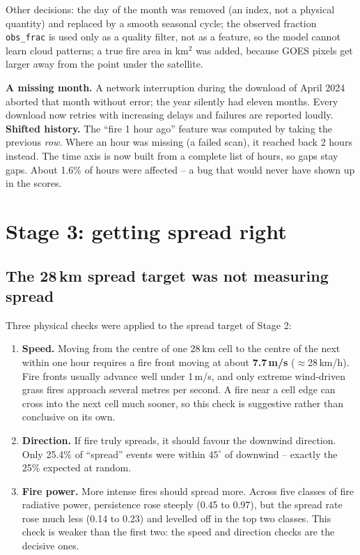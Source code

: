 \documentclass[11pt,a4paper,oneside]{report}
\newcommand{\code}[1]{\texttt{\small #1}}
\begin{document}
Other decisions: the day of the month was removed (an index, not a physical
quantity) and replaced by a smooth seasonal cycle; the observed fraction
\code{obs\_frac} is used only as a quality filter, not as a feature, so the model
cannot learn cloud patterns; a true fire area in km$^2$ was added, because GOES
pixels get larger away from the point under the satellite.

\begin{warnbox}
\textbf{A missing month.} A network interruption during the download of April
2024 aborted that month without error; the year silently had eleven months.
Every download now retries with increasing delays and failures are reported
loudly.\\[0.3em]
\textbf{Shifted history.} The \enquote{fire 1 hour ago} feature was computed by
taking the previous \emph{row}. Where an hour was missing (a failed scan), it
reached back 2 hours instead. The time axis is now built from a complete list of
hours, so gaps stay gaps. About 1.6\% of hours were affected -- a bug that would
never have shown up in the scores.
\end{warnbox}

\chapter{Stage 3: getting spread right}\label{ch:spread}

\section{The 28\,km spread target was not measuring spread}

Three physical checks were applied to the spread target of Stage 2:

\begin{enumerate}
  \item \textbf{Speed.} Moving from the centre of one 28\,km cell to the centre
        of the next within one hour requires a fire front moving at about
        \textbf{7.7\,m/s} ($\approx$28\,km/h). Fire fronts usually advance well
        under 1\,m/s, and only extreme wind-driven grass fires approach several
        metres per second. A fire near a cell edge can cross into the next cell
        much sooner, so this check is suggestive rather than conclusive on its own.
  \item \textbf{Direction.} If fire truly spreads, it should favour the
        downwind direction. Only 25.4\% of \enquote{spread} events were within
        $45^\circ$ of downwind -- exactly the 25\% expected at random.
  \item \textbf{Fire power.} More intense fires should spread more. Across five
        classes of fire radiative power, persistence rose steeply (0.45 to 0.97),
        but the spread rate rose much less (0.14 to 0.23) and levelled off in the
        top two classes. This check is weaker than the first two: the speed and
        direction checks are the decisive ones.
\end{enumerate}
\end{document}
